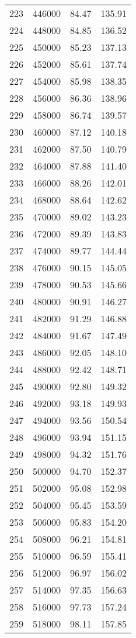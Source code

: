 \documentclass{article}
\begin{document}
\begin{longtable}{@{}l l l l}
223 & 446000 & 84.47 & 135.91\\
224 & 448000 & 84.85 & 136.52\\
225 & 450000 & 85.23 & 137.13\\
226 & 452000 & 85.61 & 137.74\\
227 & 454000 & 85.98 & 138.35\\
228 & 456000 & 86.36 & 138.96\\
229 & 458000 & 86.74 & 139.57\\
230 & 460000 & 87.12 & 140.18\\
231 & 462000 & 87.50 & 140.79\\
232 & 464000 & 87.88 & 141.40\\
233 & 466000 & 88.26 & 142.01\\
234 & 468000 & 88.64 & 142.62\\
235 & 470000 & 89.02 & 143.23\\
236 & 472000 & 89.39 & 143.83\\
237 & 474000 & 89.77 & 144.44\\
238 & 476000 & 90.15 & 145.05\\
239 & 478000 & 90.53 & 145.66\\
240 & 480000 & 90.91 & 146.27\\
241 & 482000 & 91.29 & 146.88\\
242 & 484000 & 91.67 & 147.49\\
243 & 486000 & 92.05 & 148.10\\
244 & 488000 & 92.42 & 148.71\\
245 & 490000 & 92.80 & 149.32\\
246 & 492000 & 93.18 & 149.93\\
247 & 494000 & 93.56 & 150.54\\
248 & 496000 & 93.94 & 151.15\\
249 & 498000 & 94.32 & 151.76\\
250 & 500000 & 94.70 & 152.37\\
251 & 502000 & 95.08 & 152.98\\
252 & 504000 & 95.45 & 153.59\\
253 & 506000 & 95.83 & 154.20\\
254 & 508000 & 96.21 & 154.81\\
255 & 510000 & 96.59 & 155.41\\
256 & 512000 & 96.97 & 156.02\\
257 & 514000 & 97.35 & 156.63\\
258 & 516000 & 97.73 & 157.24\\
259 & 518000 & 98.11 & 157.85\\

\end{longtable}
\end{document}

